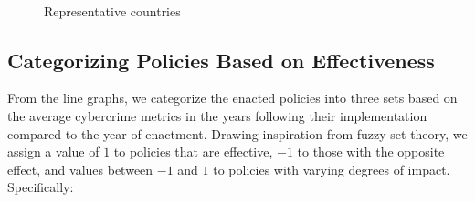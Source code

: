 \begin{figure}[htbp]
{            }\hfill
            \hfill
            \\
            \caption{Representative countries}\label{fig:representative-policy}
        \end{figure}
    
\subsection{Categorizing Policies Based on Effectiveness}\label{subsec:categorizing-policies-based-on-effectiveness} %
    From the line graphs, we categorize the enacted policies into three sets
    based on the average cybercrime metrics in the years following their implementation compared to the year of enactment.
    Drawing inspiration from fuzzy set theory,
    we assign a value of \(1\) to policies that are effective,
    \(-1\) to those with the opposite effect,
    and values between \(-1\) and \(1\) to policies with varying degrees of impact.
    Specifically:

